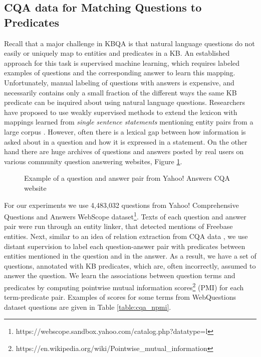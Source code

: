 \subsection{CQA data for Matching Questions to Predicates}
\label{section:method:cqa}

Recall that a major challenge in KBQA is that natural language questions do not easily or uniquely map to entities and predicates in a KB. An established approach for this task is supervised machine learning, which requires labeled examples of questions and the corresponding answer to learn this mapping. Unfortunately, manual labeling of questions with answers is expensive, and necessarily contains only a small fraction of the different ways the same KB predicate can be inquired about using natural language questions. Researchers have proposed to use weakly supervised methods to extend the lexicon with mappings learned from \textit{single sentence statements} mentioning entity pairs from a large corpus \cite{yao2014information}.
However, often there is a lexical gap between how information is asked about in a question and how it is expressed in a statement.
On the other hand there are huge archives of questions and answers posted by real users on various community question answering websites, \eg Figure \ref{fig:cqa_example}.

\begin{figure}
\centering
{}
\vspace{-0.5cm}
\caption{Example of a question and answer pair from Yahoo! Answers CQA website}
\label{fig:cqa_example}
\vspace{-0.4cm}
\end{figure}

For our experiments we use 4,483,032 questions from Yahoo! Comprehensive Questions and Answers WebScope dataset\footnote{https://webscope.sandbox.yahoo.com/catalog.php?datatype=l}.
Texts of each question and answer pair were run through an entity linker, that detected mentions of Freebase entities.
Next, similar to an idea of relation extraction from CQA data \cite{savenkov-EtAl:2015:SRW}, we use distant supervision to label each question-answer pair with predicates between entities mentioned in the question and in the answer.
As a result, we have a set of questions, annotated with KB predicates, which are, often incorrectly, assumed to answer the question.
We learn the associations between question terms and predicates by computing pointwise mutual information scores\footnote{https://en.wikipedia.org/wiki/Pointwise\_mutual\_information} (PMI) for each term-predicate pair.
Examples of scores for some terms from WebQuestions dataset questions are given in Table \ref{table:cqa_npmi}.

